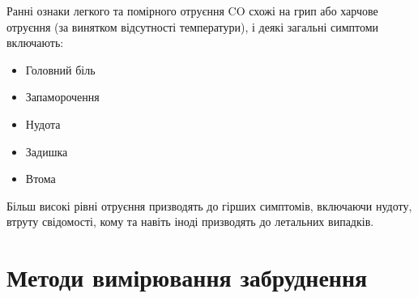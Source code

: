 Ранні ознаки легкого та помірного отруєння CO схожі на грип або харчове отруєння (за винятком відсутності температури), і деякі загальні симптоми включають:

\begin{multicols}{2}
    \begin{itemize}
        \item Головний біль
        \item Запаморочення 
        \item Нудота
        \item Задишка 
        \item Втома 
    \end{itemize}
\end{multicols}

Більш високі рівні отруєння призводять до гірших симптомів, включаючи нудоту, втруту свідомості, кому та навіть іноді призводять до летальних випадків.



\section{Методи вимірювання забруднення}
